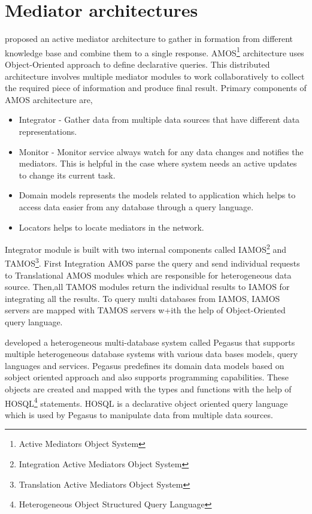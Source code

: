 	\section{Mediator architectures}
	\citet{fahl1993amos} proposed an active mediator architecture to gather in
	formation from different knowledge base and combine them to a single response. AMOS\footnote{\label{amos}Active Mediators Object System} architecture uses Object-Oriented approach to define declarative queries. This distributed architecture involves multiple mediator modules to work collaboratively to collect the required piece of information and produce final result. Primary components of AMOS architecture are,
	\begin{itemize}
		\item Integrator - Gather data from multiple data sources that have different data representations.
		\item Monitor - Monitor service always watch for any data changes and notifies the mediators. This is helpful in the case where system needs an active updates to change its current task.
		\item Domain models represents the models related to application which helps to access data easier from any database through a query language.
		\item Locators helps to locate mediators in the network.
	\end{itemize}
	
	
	Integrator module is built with two internal components called IAMOS\footnote{\label{amos}Integration Active Mediators Object System} and TAMOS\footnote{\label{amos}Translation Active Mediators Object System}. 
	First Integration AMOS parse the query and send individual requests to Translational AMOS modules which are responsible for heterogeneous data source.
	Then,all TAMOS modules return the individual results to IAMOS for integrating all the results. To query multi databases from IAMOS, IAMOS servers are mapped with TAMOS servers w+ith the help of Object-Oriented query language.
	
	
	\citet{ahmed1991pegasus} developed a heterogeneous multi-database system called Pegasus that supports multiple heterogeneous database systems with various data bases models, query languages and services. Pegasus predefines its domain data models based on sobject oriented approach and also supports programming capabilities. These objects are created and mapped with the types and functions with the help of HOSQL\footnote{\label{myfootnote}Heterogeneous Object Structured Query Language} statements. HOSQL is a declarative object oriented query language which is used by Pegasus to manipulate data from multiple data sources.
	
